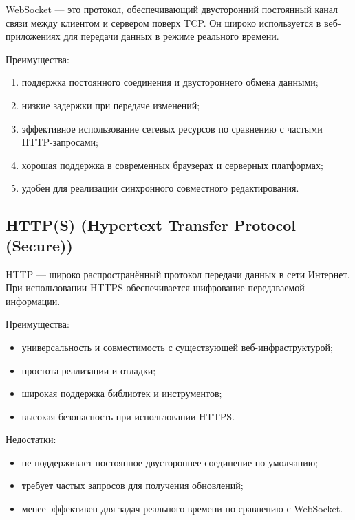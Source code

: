 WebSocket — это протокол, обеспечивающий двусторонний постоянный канал связи между клиентом и сервером поверх TCP. Он широко используется в веб-приложениях для передачи данных в режиме реального времени.

Преимущества:

\begin{enumerate}
    \item поддержка постоянного соединения и двустороннего обмена данными;
    \item низкие задержки при передаче изменений;
    \item эффективное использование сетевых ресурсов по сравнению с частыми HTTP-запросами;
    \item хорошая поддержка в современных браузерах и серверных платформах;
    \item удобен для реализации синхронного совместного редактирования.
\end{enumerate}


\subsection*{HTTP(S) (Hypertext Transfer Protocol (Secure))}

HTTP — широко распространённый протокол передачи данных в сети Интернет. При использовании HTTPS обеспечивается шифрование передаваемой информации.

Преимущества:

\begin{itemize}
    \item универсальность и совместимость с существующей веб-инфраструктурой;
    \item простота реализации и отладки;
    \item широкая поддержка библиотек и инструментов;
    \item высокая безопасность при использовании HTTPS.
\end{itemize}

Недостатки:

\begin{itemize}
    \item не поддерживает постоянное двустороннее соединение по умолчанию;
    \item требует частых запросов для получения обновлений;
    \item менее эффективен для задач реального времени по сравнению с WebSocket.
\end{itemize}

